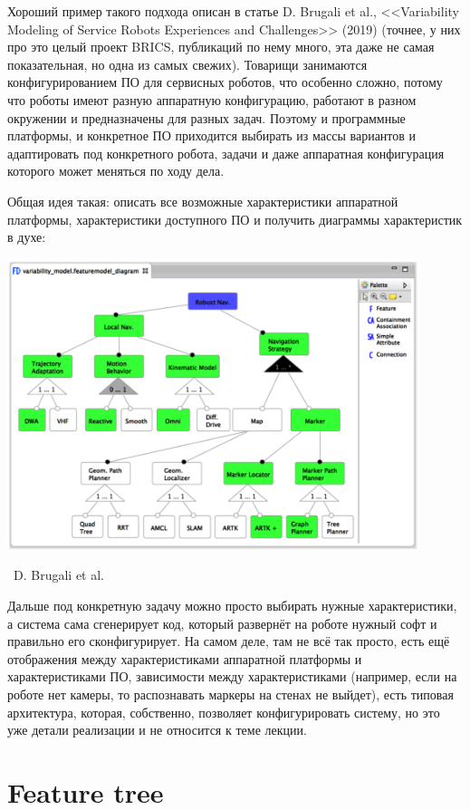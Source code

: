 \documentclass[a5paper]{article}
\newcommand{\attribution}[1] {
    \vspace{-4mm}\begin{flushright}\begin{scriptsize}%
    {\textcopyright\, #1}\end{scriptsize}\end{flushright}
}
\begin{document}
Хороший пример такого подхода описан в статье D. Brugali et al., <<Variability Modeling of Service Robots Experiences and Challenges>> (2019) (точнее, у них про это целый проект BRICS, публикаций по нему много, эта даже не самая показательная, но одна из самых свежих). Товарищи занимаются конфигурированием ПО для сервисных роботов, что особенно сложно, потому что роботы имеют разную аппаратную конфигурацию, работают в разном окружении и предназначены для разных задач. Поэтому и программные платформы, и конкретное ПО приходится выбирать из массы вариантов и адаптировать под конкретного робота, задачи и даже аппаратная конфигурация которого может меняться по ходу дела.

Общая идея такая: описать все возможные характеристики аппаратной платформы, характеристики доступного ПО и получить диаграммы характеристик в духе:

\begin{center}
    \includegraphics[width=0.9\textwidth]{featureDiagramExample.png}
    \attribution{D. Brugali et al.}
\end{center}

Дальше под конкретную задачу можно просто выбирать нужные характеристики, а система сама сгенерирует код, который развернёт на роботе нужный софт и правильно его сконфигурирует. На самом деле, там не всё так просто, есть ещё отображения между характеристиками аппаратной платформы и характеристиками ПО, зависимости между характеристиками (например, если на роботе нет камеры, то распознавать маркеры на стенах не выйдет), есть типовая архитектура, которая, собственно, позволяет конфигурировать систему, но это уже детали реализации и не относится к теме лекции.

\section{Feature tree}
\end{document}
